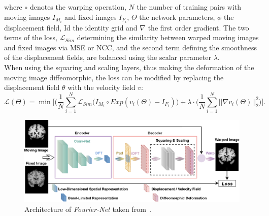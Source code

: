 \documentclass[english,version-2022-01]{uzl-thesis} %
\begin{document}
where $\circ$ denotes the warping operation, $N$ the number of training pairs with moving images $I_{M_i}$ and fixed images $I_{F_i}$, $\Theta$ the network parameters, $\phi$ the displacement field, Id the identity grid and $\nabla$ the first order gradient. The two terms of the loss, $\mathcal{L}_{Sim}$ determining the similarity between warped moving images and fixed images via MSE or NCC, and the second term defining the smoothness of the displacement fields, are balanced using the scalar parameter $\lambda$.\\
When using the squaring and scaling layers, thus making the deformation of the moving image diffeomorphic, the loss can be modified by replacing the displacement field $\theta$ with the velocity field $v$:
\begin{equation}
	\mathcal{L}(\Theta) = \min \bigg[ \bigg( \frac{1}{N} \sum^{N}_{i=1} \mathcal{L}_{Sim} (I_{M_i} \circ Exp(v_i(\Theta) - I_{F_i}) \bigg) + \lambda \cdot \bigg( \frac{1}{N} \sum^{N}_{i=1} || \nabla v_i(\Theta) ||^2_2 \bigg) \bigg] .
\end{equation}


\begin{figure}[htpb]
	\centering
	\graphicspath{{images/}{\main/images/}}
	\includegraphics[width=\linewidth]{ArchitectureFourier-Net.png} 
	\caption{Architecture of \emph{Fourier-Net} taken from~\cite{Fourier-Net}.}
	\label{fig:Fourier-Net}
\end{figure}
\end{document}
